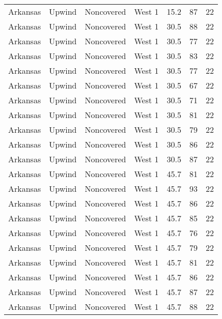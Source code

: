 \documentclass{article}
\begin{document}
\begin{longtable}[H]{ccccccc}
Arkansas & Upwind    & Noncovered & West 1        & 15.2         & 87          & 22  \\
Arkansas & Upwind    & Noncovered & West 1        & 30.5         & 88          & 22  \\
Arkansas & Upwind    & Noncovered & West 1        & 30.5         & 77          & 22  \\
Arkansas & Upwind    & Noncovered & West 1        & 30.5         & 83          & 22  \\
Arkansas & Upwind    & Noncovered & West 1        & 30.5         & 77          & 22  \\
Arkansas & Upwind    & Noncovered & West 1        & 30.5         & 67          & 22  \\
Arkansas & Upwind    & Noncovered & West 1        & 30.5         & 71          & 22  \\
Arkansas & Upwind    & Noncovered & West 1        & 30.5         & 81          & 22  \\
Arkansas & Upwind    & Noncovered & West 1        & 30.5         & 79          & 22  \\
Arkansas & Upwind    & Noncovered & West 1        & 30.5         & 86          & 22  \\
Arkansas & Upwind    & Noncovered & West 1        & 30.5         & 87          & 22  \\
Arkansas & Upwind    & Noncovered & West 1        & 45.7         & 81          & 22  \\
Arkansas & Upwind    & Noncovered & West 1        & 45.7         & 93          & 22  \\
Arkansas & Upwind    & Noncovered & West 1        & 45.7         & 86          & 22  \\
Arkansas & Upwind    & Noncovered & West 1        & 45.7         & 85          & 22  \\
Arkansas & Upwind    & Noncovered & West 1        & 45.7         & 76          & 22  \\
Arkansas & Upwind    & Noncovered & West 1        & 45.7         & 79          & 22  \\
Arkansas & Upwind    & Noncovered & West 1        & 45.7         & 81          & 22  \\
Arkansas & Upwind    & Noncovered & West 1        & 45.7         & 86          & 22  \\
Arkansas & Upwind    & Noncovered & West 1        & 45.7         & 87          & 22  \\
Arkansas & Upwind    & Noncovered & West 1        & 45.7         & 88          & 22  \\

\end{longtable}
\end{document}
